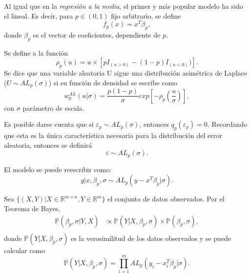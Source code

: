 Al igual que en la \textit{regresi\'on a la media}, el primer y m\'as popular modelo ha sido el lineal. Es decir, para $p \in (0,1)$ fijo arbitrario, se define
\begin{equation*}
    f_p(x) = x^T\beta_p, 
\end{equation*}
donde $\beta_p$ es el vector de coeficientes, dependiente de $p$.

\begin{defin}
    Se define a la funci\'on
    \begin{equation*}
        \rho_p(u) = u \times [pI_{(u>0)} - (1-p) I_{(u<0)})].
    \end{equation*}
    Se dice que una variable aleatoria U sigue una distribuci\'on asim\'etrica de Laplace ($U \sim AL_p(\sigma)$) si su funci\'on de densidad se escribe como
    \begin{equation*}
        w_p^{AL}(u|\sigma) = 
        \frac{p(1-p)}{\sigma}
        exp\left[
        -\rho_p
        \left(
        \frac{u}{\sigma}
        \right)
        \right],
    \end{equation*}
con $\sigma$ par\'ametro de escala.
\end{defin}

Es posible darse cuenta que si $\varepsilon_p \sim AL_p(\sigma)$, entonces $q_p(\varepsilon_p) = 0$. Recordando que esta es la \'unica caracter\'istica necesaria para la distribuci\'on del error aleatoria, entonces se definir\'a
\begin{equation*}
    \varepsilon \sim AL_p(\sigma).
\end{equation*}

El modelo se puede reescribir como:
\begin{equation*}
    y | x, \beta_p, \sigma 
    \sim 
    AL_p(y - x^T\beta_p|\sigma).
\end{equation*}

Sea $\{(X,Y) | X \in \mathbb{R}^{m \times n}, Y \in \mathbb{R}^m\}$ el conjunto de datos observados. Por el Teorema de Bayes,
\begin{equation*}
\begin{aligned}
    \mathbb{P}(\beta_p,\sigma | Y, X) 
    &\propto \mathbb{P}(Y| X, \beta_p, \sigma) \times \mathbb{P}(\beta_p, \sigma), \\
\end{aligned}
\end{equation*}
donde $\mathbb{P}(Y| X, \beta_p, \sigma)$ es la verosimilitud de los datos observados y se puede calcular como 
\begin{equation*}
    \mathbb{P}(Y| X, \beta_p, \sigma)
    =
    \prod_{i=1}^m AL_p(y_i - x_i^T\beta_p|\sigma).
\end{equation*}

